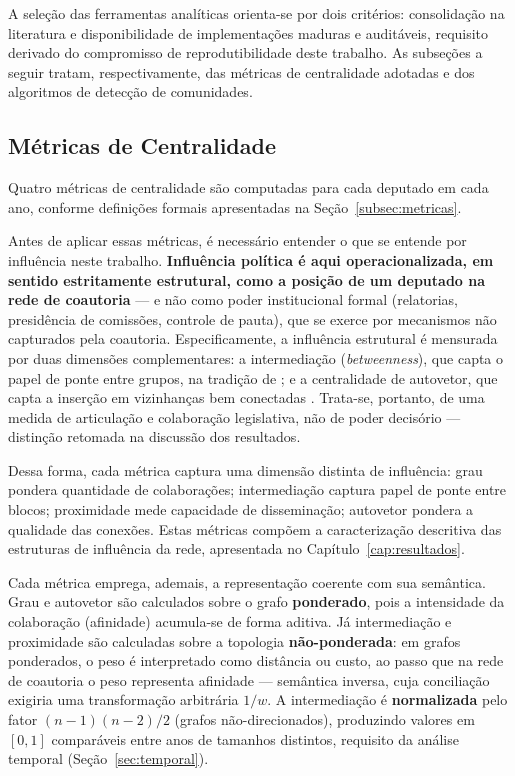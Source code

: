 \documentclass[
      12pt,
      a4paper,
      openright,
      oneside,
      chapter=TITLE,
      section=TITLE,
      english,
      french,
      spanish,
      brazilian
    ]{abntex2}
\begin{document}
    A seleção das ferramentas analíticas orienta-se por dois critérios: consolidação
    na literatura e disponibilidade de implementações maduras e auditáveis, requisito
    derivado do compromisso de reprodutibilidade deste trabalho. As subseções a
    seguir tratam, respectivamente, das métricas de centralidade adotadas e dos
    algoritmos de detecção de comunidades.
    
    \subsection{Métricas de Centralidade}
    
    Quatro métricas de centralidade são computadas para cada deputado em cada ano, conforme definições formais apresentadas na Seção~\ref{subsec:metricas}.
    
    Antes de aplicar essas métricas, é necessário entender o que se entende por influência neste trabalho. \textbf{Influência política é aqui operacionalizada, em sentido estritamente estrutural, como a posição de um deputado na rede de coautoria} --- e não como poder institucional formal (relatorias, presidência de comissões, controle de pauta), que se exerce por mecanismos não capturados pela coautoria. Especificamente, a influência estrutural é mensurada por duas dimensões complementares: a intermediação (\textit{betweenness}), que capta o papel de ponte entre grupos, na tradição de \cite{freeman1977}; e a centralidade de autovetor, que capta a inserção em vizinhanças bem conectadas \cite{bonacich1972}. Trata-se, portanto, de uma medida de articulação e colaboração legislativa, não de poder decisório --- distinção retomada na discussão dos resultados.
    
    Dessa forma, cada métrica captura uma dimensão distinta de influência: grau pondera quantidade de colaborações; intermediação captura papel de ponte entre blocos; proximidade mede capacidade de disseminação; autovetor pondera a qualidade das conexões. Estas métricas compõem a caracterização descritiva das estruturas de influência da rede, apresentada no Capítulo~\ref{cap:resultados}.
    
    Cada métrica emprega, ademais, a representação coerente com sua semântica. Grau e autovetor são calculados sobre o grafo \textbf{ponderado}, pois a intensidade da colaboração (afinidade) acumula-se de forma aditiva. Já intermediação e proximidade são calculadas sobre a topologia \textbf{não-ponderada}: em grafos ponderados, o peso é interpretado como distância ou custo, ao passo que na rede de coautoria o peso representa afinidade --- semântica inversa, cuja conciliação exigiria uma transformação arbitrária $1/w$. A intermediação é \textbf{normalizada} pelo fator $(n-1)(n-2)/2$ (grafos não-direcionados), produzindo valores em $[0,1]$ comparáveis entre anos de tamanhos distintos, requisito da análise temporal (Seção~\ref{sec:temporal}).
    
\end{document}
